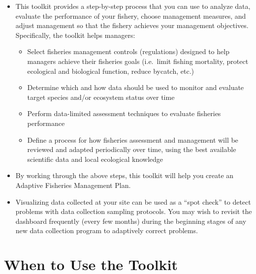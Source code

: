 \documentclass[]{book}
\begin{document}
\begin{itemize}
\item
  This toolkit provides a step-by-step process that you can use to
  analyze data, evaluate the performance of your fishery, choose
  management measures, and adjust management so that the fishery
  achieves your management objectives. Specifically, the toolkit helps
  managers:

  \begin{itemize}
  \item
    Select fisheries management controls (regulations) designed to help
    managers achieve their fisheries goals (i.e.~limit fishing
    mortality, protect ecological and biological function, reduce
    bycatch, etc.)
  \item
    Determine which and how data should be used to monitor and evaluate
    target species and/or ecosystem status over time
  \item
    Perform data-limited assessment techniques to evaluate fisheries
    performance
  \item
    Define a process for how fisheries assessment and management will be
    reviewed and adapted periodically over time, using the best
    available scientific data and local ecological knowledge
  \end{itemize}
\item
  By working through the above steps, this toolkit will help you create
  an Adaptive Fisheries Management Plan.
\item
  Visualizing data collected at your site can be used as a ``spot
  check'' to detect problems with data collection sampling protocols.
  You may wish to revisit the dashboard frequently (every few months)
  during the beginning stages of any new data collection program to
  adaptively correct problems.
\end{itemize}

\section{When to Use the Toolkit}\label{when-to-use-the-toolkit}
\end{document}
